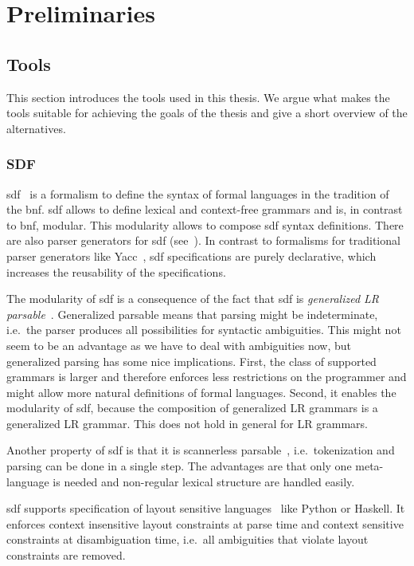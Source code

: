 \chapter{Preliminaries}
\label{cha:preliminaries}
\section{Tools}
This section introduces the tools used in this thesis. We argue what
makes the tools suitable for achieving the goals of the thesis and
give a short overview of the alternatives.

\subsection{SDF}
\gls{sdf}~\cite{Heering:1989:SDF:71605.71607} is a formalism to define
the syntax of formal languages in the tradition of the
\gls{bnf}. \gls{sdf} allows to define lexical and context-free
grammars and is, in contrast to \gls{bnf}, modular. This modularity
allows to compose \gls{sdf} syntax definitions. There are also parser
generators for \gls{sdf} (see~\cite{Rekers92parsergeneration}). In
contrast to formalisms for traditional parser generators like
Yacc~\cite{Johnson75yacc:yet}, \gls{sdf} specifications are purely
declarative, which increases the reusability of the specifications.

The modularity of \gls{sdf} is a consequence of the fact that
\gls{sdf} is \textit{generalized LR
  parsable}~\cite{Rekers92parsergeneration}. Generalized parsable
means that parsing might be indeterminate, i.e.\ the parser produces
all possibilities for syntactic ambiguities. This might not seem to be
an advantage as we have to deal with ambiguities now, but generalized
parsing has some nice implications. First, the class of supported
grammars is larger and therefore enforces less restrictions on the
programmer and might allow more natural definitions of formal
languages. Second, it enables the modularity of \gls{sdf}, because the
composition of generalized LR grammars is a generalized LR
grammar. This does not hold in general for LR grammars.

Another property of \gls{sdf} is that it is scannerless
parsable~\cite{Brand02disambiguationfilters}, i.e.\ tokenization and
parsing can be done in a single step. The advantages are that only one
meta-language is needed and non-regular lexical structure are handled
easily.

\gls{sdf} supports specification of layout sensitive
languages~\cite{conf/sle/ErdwegRKO12} like Python or Haskell. It
enforces context insensitive layout constraints at parse time and
context sensitive constraints at disambiguation time, i.e.\ all
ambiguities that violate layout constraints are removed.

